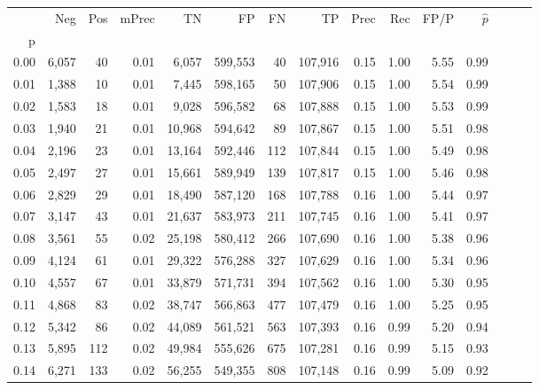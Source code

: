 \begin{tabular}{rrrrrrrrrrrrrrr}
\toprule
{} &     Neg &    Pos & mPrec &       TN &       FP &       FN &       TP &  Prec &   Rec &  FP/P & $\hat{p}$ \\
p    &         &        &       &          &          &          &          &       &       &       &           \\
\midrule
0.00 &   6,057 &     40 &  0.01 &    6,057 &  599,553 &       40 &  107,916 &  0.15 &  1.00 &  5.55 &      0.99 \\
0.01 &   1,388 &     10 &  0.01 &    7,445 &  598,165 &       50 &  107,906 &  0.15 &  1.00 &  5.54 &      0.99 \\
0.02 &   1,583 &     18 &  0.01 &    9,028 &  596,582 &       68 &  107,888 &  0.15 &  1.00 &  5.53 &      0.99 \\
0.03 &   1,940 &     21 &  0.01 &   10,968 &  594,642 &       89 &  107,867 &  0.15 &  1.00 &  5.51 &      0.98 \\
0.04 &   2,196 &     23 &  0.01 &   13,164 &  592,446 &      112 &  107,844 &  0.15 &  1.00 &  5.49 &      0.98 \\
0.05 &   2,497 &     27 &  0.01 &   15,661 &  589,949 &      139 &  107,817 &  0.15 &  1.00 &  5.46 &      0.98 \\
0.06 &   2,829 &     29 &  0.01 &   18,490 &  587,120 &      168 &  107,788 &  0.16 &  1.00 &  5.44 &      0.97 \\
0.07 &   3,147 &     43 &  0.01 &   21,637 &  583,973 &      211 &  107,745 &  0.16 &  1.00 &  5.41 &      0.97 \\
0.08 &   3,561 &     55 &  0.02 &   25,198 &  580,412 &      266 &  107,690 &  0.16 &  1.00 &  5.38 &      0.96 \\
0.09 &   4,124 &     61 &  0.01 &   29,322 &  576,288 &      327 &  107,629 &  0.16 &  1.00 &  5.34 &      0.96 \\
0.10 &   4,557 &     67 &  0.01 &   33,879 &  571,731 &      394 &  107,562 &  0.16 &  1.00 &  5.30 &      0.95 \\
0.11 &   4,868 &     83 &  0.02 &   38,747 &  566,863 &      477 &  107,479 &  0.16 &  1.00 &  5.25 &      0.95 \\
0.12 &   5,342 &     86 &  0.02 &   44,089 &  561,521 &      563 &  107,393 &  0.16 &  0.99 &  5.20 &      0.94 \\
0.13 &   5,895 &    112 &  0.02 &   49,984 &  555,626 &      675 &  107,281 &  0.16 &  0.99 &  5.15 &      0.93 \\
0.14 &   6,271 &    133 &  0.02 &   56,255 &  549,355 &      808 &  107,148 &  0.16 &  0.99 &  5.09 &      0.92 \\

\end{tabular}
